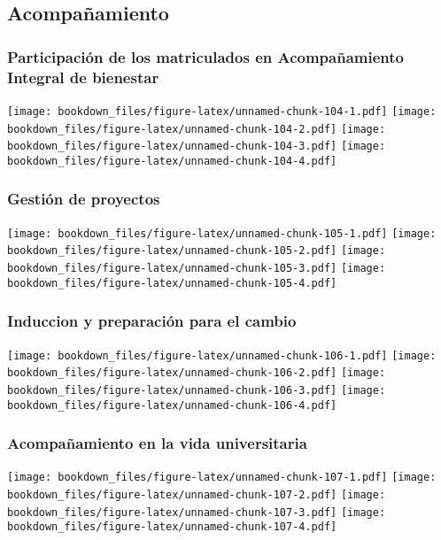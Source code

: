 \documentclass[]{article}
\theoremstyle{definition}
\theoremstyle{definition}
\theoremstyle{definition}
\theoremstyle{remark}
\begin{document}
\subsection{Acompañamiento}\label{acompanamiento}

\subsubsection{Participación de los matriculados en Acompañamiento
Integral de
bienestar}\label{participacion-de-los-matriculados-en-acompanamiento-integral-de-bienestar}

\texttt{[image: bookdown\_files/figure-latex/unnamed-chunk-104-1.pdf]}
\texttt{[image: bookdown\_files/figure-latex/unnamed-chunk-104-2.pdf]}
\texttt{[image: bookdown\_files/figure-latex/unnamed-chunk-104-3.pdf]}
\texttt{[image: bookdown\_files/figure-latex/unnamed-chunk-104-4.pdf]}

\subsubsection{Gestión de proyectos}\label{gestion-de-proyectos}

\texttt{[image: bookdown\_files/figure-latex/unnamed-chunk-105-1.pdf]}
\texttt{[image: bookdown\_files/figure-latex/unnamed-chunk-105-2.pdf]}
\texttt{[image: bookdown\_files/figure-latex/unnamed-chunk-105-3.pdf]}
\texttt{[image: bookdown\_files/figure-latex/unnamed-chunk-105-4.pdf]}

\subsubsection{Induccion y preparación para el
cambio}\label{induccion-y-preparacion-para-el-cambio}

\texttt{[image: bookdown\_files/figure-latex/unnamed-chunk-106-1.pdf]}
\texttt{[image: bookdown\_files/figure-latex/unnamed-chunk-106-2.pdf]}
\texttt{[image: bookdown\_files/figure-latex/unnamed-chunk-106-3.pdf]}
\texttt{[image: bookdown\_files/figure-latex/unnamed-chunk-106-4.pdf]}

\subsubsection{Acompañamiento en la vida
universitaria}\label{acompanamiento-en-la-vida-universitaria}

\texttt{[image: bookdown\_files/figure-latex/unnamed-chunk-107-1.pdf]}
\texttt{[image: bookdown\_files/figure-latex/unnamed-chunk-107-2.pdf]}
\texttt{[image: bookdown\_files/figure-latex/unnamed-chunk-107-3.pdf]}
\texttt{[image: bookdown\_files/figure-latex/unnamed-chunk-107-4.pdf]}
\end{document}
